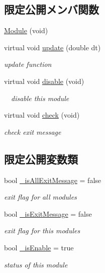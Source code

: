 \subsection*{限定公開メンバ関数}
\begin{DoxyCompactItemize}
\item 
\hyperlink{classfractal_1_1Module_a43c2b0b93b603ee601af3c90931ff7f6}{Module} (void)
\item 
virtual void \hyperlink{classfractal_1_1Module_ad68342ebc960bb0e1dd19b7c70bc3753}{update} (double dt)
\begin{DoxyCompactList}\small\item\em update function \end{DoxyCompactList}\item 
virtual void \hyperlink{classfractal_1_1Module_a17a7773769fb523fd4b2aeb28366debe}{disable} (void)
\begin{DoxyCompactList}\small\item\em 　disable this module \end{DoxyCompactList}\item 
virtual void \hyperlink{classfractal_1_1Module_a245865f346ac1d21b19bce418bf704c4}{check} (void)
\begin{DoxyCompactList}\small\item\em check exit message \end{DoxyCompactList}\end{DoxyCompactItemize}
\subsection*{限定公開変数類}
\begin{DoxyCompactItemize}
\item 
bool \hyperlink{classfractal_1_1Module_aed6038d7f13a217f171c3fa1a29e7129}{\+\_\+is\+All\+Exit\+Message} = false
\begin{DoxyCompactList}\small\item\em exit flag for all modules \end{DoxyCompactList}\item 
bool \hyperlink{classfractal_1_1Module_a3c0219468a7d043c70420cca57f39989}{\+\_\+is\+Exit\+Message} = false
\begin{DoxyCompactList}\small\item\em exit flag for this modules \end{DoxyCompactList}\item 
bool \hyperlink{classfractal_1_1Module_ac1194f7c1723026348f7dc2df099ccf6}{\+\_\+is\+Enable} = true
\begin{DoxyCompactList}\small\item\em status of this module \end{DoxyCompactList}\end{DoxyCompactItemize}
